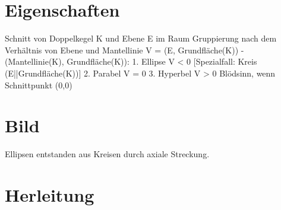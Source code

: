\setcounter{section}{0}
\section{Eigenschaften}
Schnitt von Doppelkegel K und Ebene E im Raum
Gruppierung nach dem Verhältnis von Ebene und Mantellinie V = \angle(E, Grundfläche(K)) - \angle(Mantellinie(K), Grundfläche(K)):
1. Ellipse V < 0 [Spezialfall: Kreis (E||Grundfläche(K))]
2. Parabel V = 0
3. Hyperbel V > 0
Blödsinn, wenn Schnittpunkt (0,0)
\section{Bild}
Ellipsen entstanden aus Kreisen durch axiale Streckung. ~\cite{Bourke:1988}
\section{Herleitung}